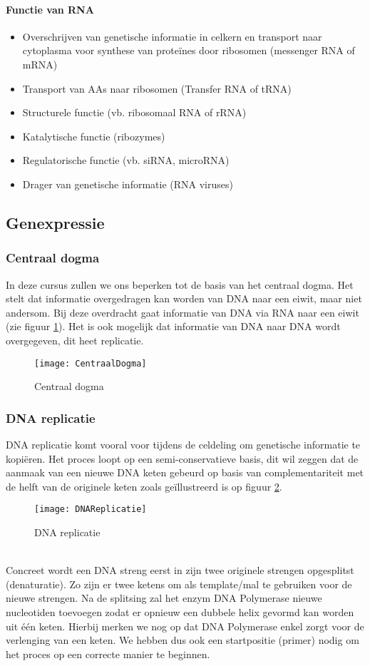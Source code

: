 \documentclass[a4paper,kul]{kulakarticle} %
\begin{document}
\paragraph{Functie van RNA}
\begin{itemize}
	\item Overschrijven van genetische informatie in celkern en transport
	naar cytoplasma voor synthese van proteïnes door ribosomen
	(messenger RNA of mRNA)
	\item Transport van AAs naar ribosomen (Transfer RNA of tRNA)
	\item Structurele functie (vb. ribosomaal RNA of rRNA)
	\item Katalytische functie (ribozymes)
	\item Regulatorische functie (vb. siRNA, microRNA)
	\item Drager van genetische informatie (RNA viruses)
\end{itemize}
\subsection{Genexpressie}
\subsubsection{Centraal dogma}
In deze cursus zullen we ons beperken tot de basis van het centraal dogma. Het stelt dat informatie overgedragen kan worden van DNA naar een eiwit, maar niet andersom. Bij deze overdracht gaat informatie van DNA via RNA naar een eiwit (zie figuur \ref{fig:centraaldogma}). Het is ook mogelijk dat informatie van DNA naar DNA wordt overgegeven, dit heet replicatie. 
\begin{figure}[h]
	\centering
	\texttt{[image: CentraalDogma]}
	\caption[Centraal Dogma]{Centraal dogma}
	\label{fig:centraaldogma}
\end{figure}

\subsubsection{DNA replicatie}
DNA replicatie komt vooral voor tijdens de celdeling om genetische informatie te kopiëren. Het proces loopt op een semi-conservatieve basis, dit wil zeggen dat de aanmaak van een nieuwe DNA keten gebeurd op basis van complementariteit met de helft van de originele keten zoals geïllustreerd is op figuur \ref{fig:dnareplicatie}.\\ 
\begin{figure}[h]
	\centering
	\texttt{[image: DNAReplicatie]}
	\caption[DNA replicatie]{DNA replicatie}
	\label{fig:dnareplicatie}
\end{figure}\\
Concreet wordt een DNA streng eerst in zijn twee originele strengen opgesplitst (denaturatie). Zo zijn er twee ketens om als template/mal te gebruiken voor de nieuwe strengen. Na de splitsing zal het enzym DNA Polymerase nieuwe nucleotiden toevoegen zodat er opnieuw een dubbele helix gevormd kan worden uit één keten. Hierbij merken we nog op dat DNA Polymerase enkel zorgt voor de verlenging van een keten. We hebben dus ook een startpositie (primer) nodig om het proces op een correcte manier te beginnen.
\end{document}
